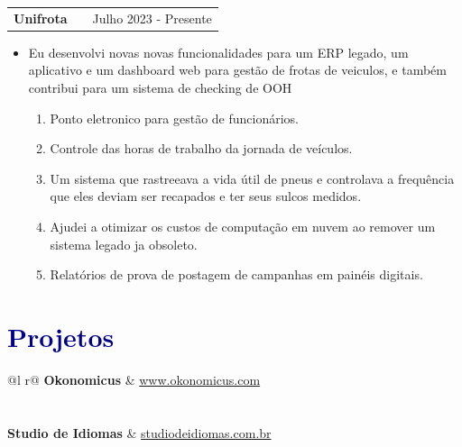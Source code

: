 \documentclass[a4paper,o12pt]{article}
\makeatletter
\newenvironment{joblong}[2]
    {
    \begin{tabularx}{\linewidth}{@{}l X r@{}}
    \textbf{#1} & \hfill &  #2 \\[3.75pt]
    \end{tabularx}
    \begin{minipage}[t]{\linewidth}
    \begin{itemize}[nosep,after=\strut, leftmargin=1em, itemsep=3pt,label=--]
    }
    {
    \end{itemize}
    \end{minipage}    
    }
\makeatother
\begin{document}
\begin{joblong}{Unifrota}{Julho 2023 - Presente}
\item Eu desenvolvi novas novas funcionalidades para um ERP legado, um aplicativo e um dashboard web para gestão de frotas de veiculos, e também contribui para 
um sistema de checking de OOH
	\begin{enumerate}
		\item Ponto eletronico para gestão de funcionários.
		\item Controle das horas de trabalho da jornada de veículos.
		\item Um sistema que rastreeava a vida útil de pneus e controlava a frequência que eles deviam ser recapados e ter seus sulcos medidos.
		\item Ajudei a otimizar os custos de computação em nuvem  ao remover um sistema legado ja obsoleto.
		\item Relatórios de prova de postagem de campanhas em painéis digitais.
	\end{enumerate}
	
\end{joblong}


\section{\textcolor{darkblue}{\textbf{ Projetos }}}


\begin{tabularx}{\linewidth}{ @{}l r@{} }
\textbf{Okonomicus} & \hfill \href{https://some-link.com}{www.okonomicus.com} \\[3.75pt]
  \\
    \\

\textbf{Studio de Idiomas} & \hfill \href{http://studiodeidiomas.com.br/}{studiodeidiomas.com.br} \\[3.75pt]
  \\

\end{tabularx}


\vfill
{}
\end{document}
